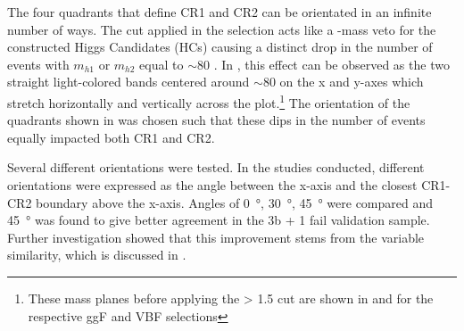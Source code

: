 The four quadrants that define CR1 and CR2 can be orientated in an infinite number of ways. The \Xwt cut applied in the selection acts like a \PW-mass veto for the constructed Higgs Candidates (HCs) causing a distinct drop in the number of events with $m_{h1}$ or $m_{h2}$ equal to $\sim$80 \GeV. In \Fig{\ref{fig:massplanes-allYrs-data}}, this effect can be observed as the two straight light-colored bands centered around $\sim$80 \GeV on the x and y-axes which stretch horizontally and vertically across the plot.\footnote{These mass planes before applying the \Xwt > 1.5 cut are shown in \Fig{\ref{fig:ggF-massplanes-Xwt}} and \Fig{\ref{fig:VBF-massplanes-Xwt}} for the respective ggF and VBF selections} The orientation of the quadrants shown in \Fig{\ref{fig:massplanes-allYrs-data}} was chosen such that these dips in the number of events equally impacted both CR1 and CR2.

Several different orientations were tested. In the studies conducted, different orientations were expressed as the angle between the x-axis and the closest CR1-CR2 boundary above the x-axis. Angles of \SI{0}{\degree}, \SI{30}{\degree}, \SI{45}{\degree} were compared and \SI{45}{\degree} was found to give better agreement 
in the 3b + 1 fail validation sample. Further investigation showed that this improvement stems from the \Xwt variable similarity, which is discussed in \App{\ref{app:sec:emd}}.

